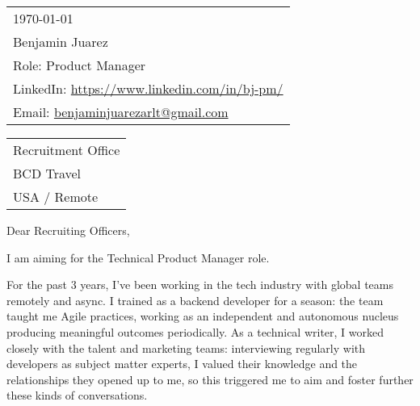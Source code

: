 \hfill%
\begin{tabular}{l @{}}
	\today \bigskip\\ %
	Benjamin Juarez \smallskip \\
	Role: %
Product Manager \\
	LinkedIn: \href{https://www.linkedin.com/in/bj-pm/?locale=en_US}{https://www.linkedin.com/in/bj-pm/} \\
	Email: \href{benjaminjuarezarlt@gmail.com}{benjaminjuarezarlt@gmail.com} \\
\end{tabular}

\bigskip %


\begin{tabular}{@{} l}
    Recruitment Office \\ %
    BCD Travel \\ 
    USA / Remote
\end{tabular}

\bigskip %


Dear Recruiting Officers,
\bigskip %


I am aiming for the Technical Product Manager role.

For the past 3 years, I've been working in the tech industry with global teams remotely and async. 
I trained as a backend developer for a season: 
the team taught me Agile practices, working as an independent and autonomous nucleus
producing meaningful outcomes periodically.
As a technical writer, I worked closely with the talent and marketing teams:
interviewing regularly with developers as subject matter experts,
I valued their knowledge and the relationships they opened up to me,
so this triggered me to aim and foster further these kinds of conversations.

